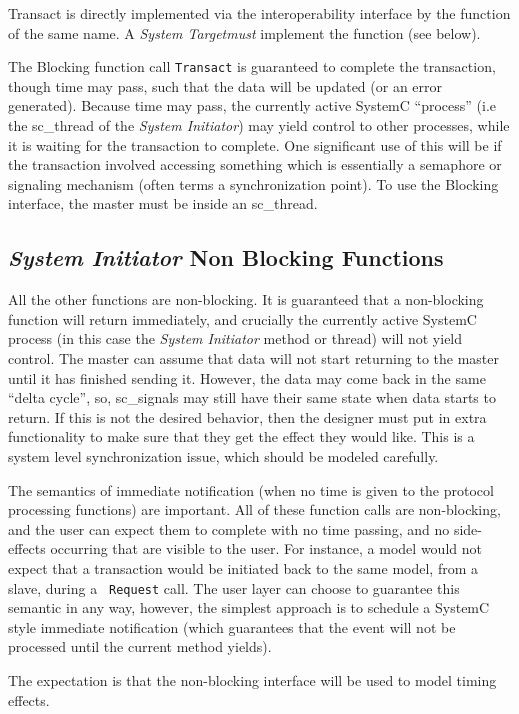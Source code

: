 \documentclass[12pt,oneside]{gsbook}
\newcommand{\master}{{\em System Initiator}\xspace}
\newcommand{\slave}{{\em System Target}\xspace}
\begin{document}
Transact is directly implemented via the interoperability interface by
the function of the same name. A \slave {\em must} implement the
function (see below).

The Blocking function call {\tt Transact} is guaranteed to complete the transaction, though time may
pass, such that the data will be updated (or an error generated). Because time may pass, the
currently active SystemC ``process'' (i.e the sc\_thread of the \master) may yield control to other
processes, while it is waiting for the transaction to complete. One significant use of this will be
if the transaction involved accessing something which is essentially a semaphore or signaling
mechanism (often terms a synchronization point). To use the Blocking interface, the master must be
inside an sc\_thread.

\subsection{\master Non Blocking Functions}
All the other functions are non-blocking. 
It is guaranteed that a non-blocking function will return immediately, and crucially the currently
active SystemC process (in this case the \master method or thread) will not yield control. The
master can assume that data will not start returning to the master until it has finished sending
it. However, the data may come back in the same ``delta cycle'', so, sc\_signals may still have their
same state when data starts to return. If this is not the desired behavior, then the designer must
put in extra functionality to make sure that they get the effect they would like. This is a system
level synchronization issue, which should be modeled carefully.

The semantics of immediate notification (when no time is given to the
protocol processing functions) are important. All of these function
calls are non-blocking, and the user can expect them to complete with
no time passing, and no side-effects occurring that are visible to the
user. For instance, a model would not expect that a transaction would
be initiated back to the same model, from a slave, during a {\tt
Request} call. The user layer can choose to guarantee this semantic in
any way, however, the simplest approach is to schedule a SystemC style
immediate notification (which guarantees that the event will not be
processed until the current method yields).

The expectation is that the non-blocking interface will be used to
model timing effects. 
\end{document}
